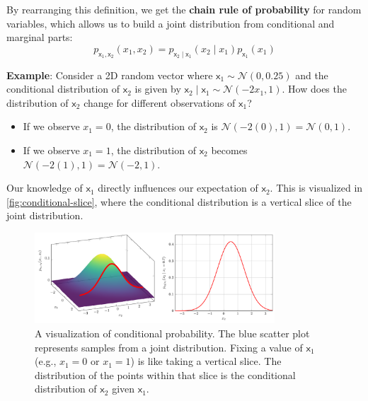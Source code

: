 By rearranging this definition, we get the \textbf{chain rule of probability} for random variables, which allows us to build a joint distribution from conditional and marginal parts:
\begin{equation}
    p_{\mathsf{x}_1, \mathsf{x}_2}(x_1, x_2) = p_{\mathsf{x}_2 \mid \mathsf{x}_1}(x_2 \mid x_1)p_{\mathsf{x}_1}(x_1)
\end{equation}

\begin{exampleBox}
    \textbf{Example}: Consider a 2D random vector where $\mathsf{x}_1 \sim \mathcal{N}(0, 0.25)$ and the conditional distribution of $\mathsf{x}_2$ is given by $\mathsf{x}_2 \mid \mathsf{x}_1 \sim \mathcal{N}(-2x_1, 1)$. How does the distribution of $\mathsf{x}_2$ change for different observations of $\mathsf{x}_1$?
    \begin{itemize}
        \item If we observe $x_1 = 0$, the distribution of $\mathsf{x}_2$ is $\mathcal{N}(-2(0), 1) = \mathcal{N}(0, 1)$.
        \item If we observe $x_1 = 1$, the distribution of $\mathsf{x}_2$ becomes $\mathcal{N}(-2(1), 1) = \mathcal{N}(-2, 1)$.
    \end{itemize}
    Our knowledge of $\mathsf{x}_1$ directly influences our expectation of $\mathsf{x}_2$. This is visualized in \autoref{fig:conditional-slice}, where the conditional distribution is a vertical slice of the joint distribution.
\end{exampleBox}

\begin{figure}[h!]
    \centering
    \includegraphics[width=0.8\textwidth]{figs/probability/conditional_fig.pdf}
    \caption{A visualization of conditional probability. The blue scatter plot represents samples from a joint distribution. Fixing a value of $\mathsf{x}_1$ (e.g., $x_1=0$ or $x_1=1$) is like taking a vertical slice. The distribution of the points within that slice is the conditional distribution of $\mathsf{x}_2$ given $\mathsf{x}_1$.}
    \label{fig:conditional-slice}
\end{figure}


